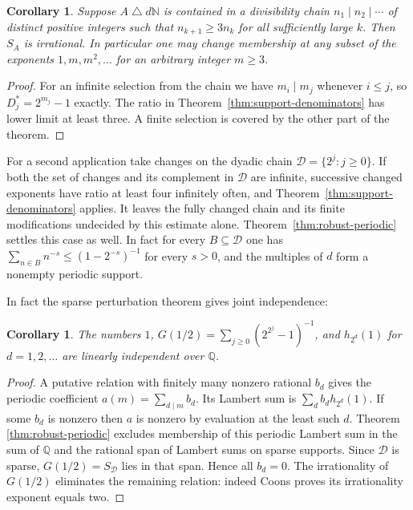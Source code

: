\documentclass[11pt,letterpaper]{article}
\newtheorem{corollary}[theorem]{Corollary}
\begin{document}
\begin{corollary}\label{cor:divisor-chains}
Suppose $A\mathbin{\triangle}d\mathbb N$ is contained in a divisibility
chain $n_1\mid n_2\mid\cdots$ of distinct positive integers such that
$n_{k+1}\ge3n_k$ for all sufficiently large $k$. Then $S_A$ is irrational.
In particular one may change membership at any subset of the exponents
$1,m,m^2,\ldots$ for an arbitrary integer $m\ge3$.
\end{corollary}

\begin{proof}
For an infinite selection from the chain we have $m_i\mid m_j$ whenever
$i\le j$, so $D_j^*=2^{m_j}-1$ exactly. The ratio in
Theorem~\ref{thm:support-denominators} has lower limit at least three.
A finite selection is covered by the other part of the theorem.
\end{proof}

For a second application take changes on the dyadic chain
$\mathcal D=\{2^j:j\ge0\}$. If both the set of changes and its
complement in $\mathcal D$ are infinite, successive changed exponents
have ratio at least four infinitely often, and
Theorem~\ref{thm:support-denominators} applies. It leaves the
fully changed chain and its finite modifications undecided by this
estimate alone. Theorem~\ref{thm:robust-periodic} settles this case
as well. In fact for every $B\subseteq\mathcal D$ one has
$\sum_{n\in B}n^{-s}\le(1-2^{-s})^{-1}$ for every $s>0$, and the
multiples of $d$ form a nonempty periodic support.

In fact the sparse perturbation theorem gives joint independence:
\begin{corollary}\label{cor:q-harmonic-dyadic}
The numbers $1$, $G(1/2)=\sum_{j\ge0}(2^{2^j}-1)^{-1}$, and
$h_{2^d}(1)$ for $d=1,2,\ldots$ are linearly independent over
$\mathbb Q$.
\end{corollary}
\begin{proof}
A putative relation with finitely many nonzero rational $b_d$ gives
the periodic coefficient $a(m)=\sum_{d\mid m}b_d$. Its Lambert
sum is $\sum_d b_dh_{2^d}(1)$. If some $b_d$ is nonzero then
$a$ is nonzero by evaluation at the least such $d$. Theorem
\ref{thm:robust-periodic} excludes membership of this periodic
Lambert sum in the sum of $\mathbb Q$ and the rational span of
Lambert sums on sparse supports. Since $\mathcal D$ is sparse,
$G(1/2)=S_{\mathcal D}$ lies in that span. Hence all $b_d=0$.
The irrationality of $G(1/2)$ eliminates the remaining relation:
indeed Coons \cite{coons} proves its irrationality exponent equals two.
\end{proof}
\end{document}
